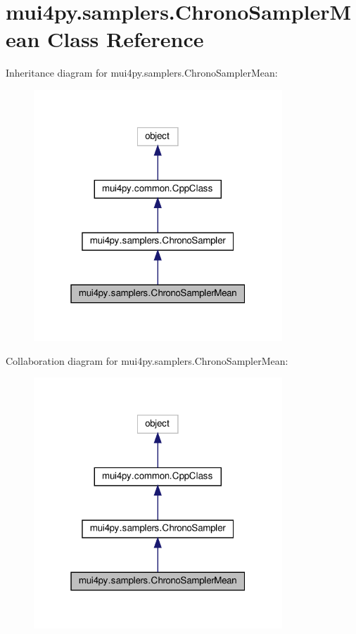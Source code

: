 \hypertarget{classmui4py_1_1samplers_1_1_chrono_sampler_mean}{}\section{mui4py.\+samplers.\+Chrono\+Sampler\+Mean Class Reference}
\label{classmui4py_1_1samplers_1_1_chrono_sampler_mean}


Inheritance diagram for mui4py.\+samplers.\+Chrono\+Sampler\+Mean\+:
\nopagebreak
\begin{figure}[H]
\begin{center}
\leavevmode
\includegraphics[width=265pt]{classmui4py_1_1samplers_1_1_chrono_sampler_mean__inherit__graph}
\end{center}
\end{figure}


Collaboration diagram for mui4py.\+samplers.\+Chrono\+Sampler\+Mean\+:
\nopagebreak
\begin{figure}[H]
\begin{center}
\leavevmode
\includegraphics[width=265pt]{classmui4py_1_1samplers_1_1_chrono_sampler_mean__coll__graph}
\end{center}
\end{figure}
